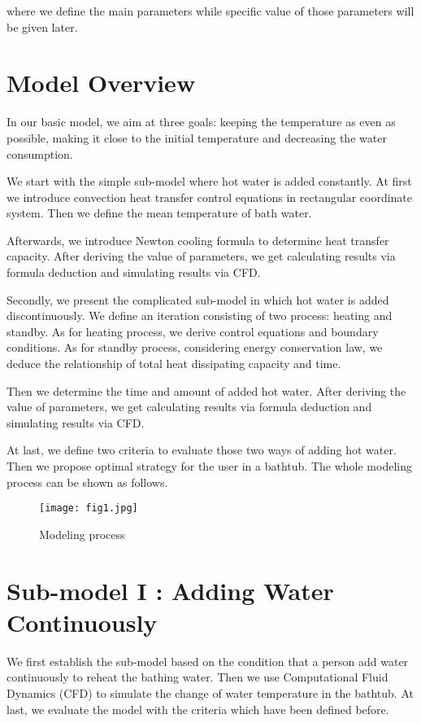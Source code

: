 \documentclass{mcmthesis}
\begin{document}
\noindent where we define the main parameters while specific value of those parameters will be given later.

\section{Model Overview}

In our basic model, we aim at three goals: keeping the temperature as even as possible, making it close to the initial temperature and decreasing the water consumption.

We start with the simple sub-model where hot water is added constantly.
At first we introduce convection heat transfer control equations in rectangular coordinate system. Then we define the mean temperature of bath water.

Afterwards, we introduce Newton cooling formula to determine heat transfer
capacity. After deriving the value of parameters, we get calculating results via formula deduction and simulating results via CFD.

Secondly, we present the complicated sub-model in which hot water is
added discontinuously. We define an iteration consisting of two process:
heating and standby. As for heating process, we derive control equations and boundary conditions. As for standby process, considering energy conservation law, we deduce the relationship of total heat dissipating capacity and time.

Then we determine the time and amount of added hot water. After deriving the value of parameters, we get calculating results via formula deduction and simulating results via CFD.

At last, we define two criteria to evaluate those two ways of adding hot water. Then we propose optimal strategy for the user in a bathtub.
The whole modeling process can be shown as follows.

\begin{figure}[h] 
\centering
\texttt{[image: fig1.jpg]}
\caption{Modeling process} \label{fig1}
\end{figure}

\section{Sub-model I : Adding Water Continuously}

We first establish the sub-model based on the condition that a person add water continuously to reheat the bathing water. Then we use Computational Fluid Dynamics (CFD) to simulate the change of water temperature in the bathtub. At last, we evaluate the model with the criteria which have been defined before.
\end{document}
